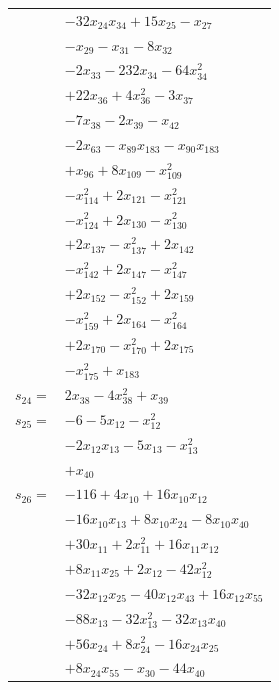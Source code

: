 \begin{longtable}{@{}r@{\;}l@{}}
 & \(\displaystyle -32x_{24}x_{34} +15x_{25} -x_{27}\) \\
 & \(\displaystyle -x_{29} -x_{31} -8x_{32}\) \\
 & \(\displaystyle -2x_{33} -232x_{34} -64x_{34}^{2}\) \\
 & \(\displaystyle +22x_{36} +4x_{36}^{2} -3x_{37}\) \\
 & \(\displaystyle -7x_{38} -2x_{39} -x_{42}\) \\
 & \(\displaystyle -2x_{63} -x_{89}x_{183} -x_{90}x_{183}\) \\
 & \(\displaystyle +x_{96} +8x_{109} -x_{109}^{2}\) \\
 & \(\displaystyle -x_{114}^{2} +2x_{121} -x_{121}^{2}\) \\
 & \(\displaystyle -x_{124}^{2} +2x_{130} -x_{130}^{2}\) \\
 & \(\displaystyle +2x_{137} -x_{137}^{2} +2x_{142}\) \\
 & \(\displaystyle -x_{142}^{2} +2x_{147} -x_{147}^{2}\) \\
 & \(\displaystyle +2x_{152} -x_{152}^{2} +2x_{159}\) \\
 & \(\displaystyle -x_{159}^{2} +2x_{164} -x_{164}^{2}\) \\
 & \(\displaystyle +2x_{170} -x_{170}^{2} +2x_{175}\) \\
 & \(\displaystyle -x_{175}^{2} +x_{183}\) \\[3pt]
\(s_{24}=\) & \(\displaystyle 2x_{38} -4x_{38}^{2} +x_{39}\) \\[3pt]
\(s_{25}=\) & \(\displaystyle -6 -5x_{12} -x_{12}^{2}\) \\
 & \(\displaystyle -2x_{12}x_{13} -5x_{13} -x_{13}^{2}\) \\
 & \(\displaystyle +x_{40}\) \\[3pt]
\(s_{26}=\) & \(\displaystyle -116 +4x_{10} +16x_{10}x_{12}\) \\
 & \(\displaystyle -16x_{10}x_{13} +8x_{10}x_{24} -8x_{10}x_{40}\) \\
 & \(\displaystyle +30x_{11} +2x_{11}^{2} +16x_{11}x_{12}\) \\
 & \(\displaystyle +8x_{11}x_{25} +2x_{12} -42x_{12}^{2}\) \\
 & \(\displaystyle -32x_{12}x_{25} -40x_{12}x_{43} +16x_{12}x_{55}\) \\
 & \(\displaystyle -88x_{13} -32x_{13}^{2} -32x_{13}x_{40}\) \\
 & \(\displaystyle +56x_{24} +8x_{24}^{2} -16x_{24}x_{25}\) \\
 & \(\displaystyle +8x_{24}x_{55} -x_{30} -44x_{40}\) \\

\end{longtable}
